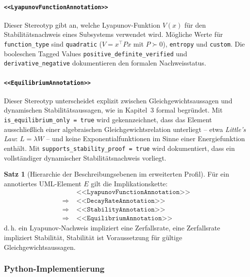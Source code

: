 ﻿\documentclass[a4paper,12pt]{scrreprt}
\theoremstyle{definition}
\newtheorem{satz}{Satz}[section]
\begin{document}
\paragraph{\texttt{<<LyapunovFunctionAnnotation>>}}

Dieser Stereotyp gibt an, welche Lyapunov-Funk\-tion $V(x)$ für den
Stabilitätsnachweis eines Subsystems verwendet wird. Mögliche Werte für
\texttt{function\_type} sind \texttt{quadratic} ($V = x^\top P x$ mit
$P \succ 0$), \texttt{entropy} und \texttt{custom}. Die booleschen Tagged
Values \texttt{positive\_definite\_verified} und
\texttt{derivative\_nega\newline tive} dokumentieren den formalen Nachweisstatus.

\paragraph{\texttt{<<EquilibriumAnnotation>>}}

Dieser Stereotyp unterscheidet explizit zwischen Gleichgewichtsaussagen und
dynamischen Stabilitätsaussagen, wie in Kapitel~3 formal begründet. Mit
\texttt{is\_equilibrium\_only = true} wird gekennzeichnet, dass das Element
ausschließlich einer algebraischen Gleichgewichtsrelation unterliegt -- etwa
\textit{Little's Law}: $L = \lambda W$ -- und keine Exponentialfunktionen
im Sinne einer Energiefunktion enthält. Mit
\texttt{supports\_stability\_proof = true} wird dokumentiert, dass ein
vollständiger dynamischer Stabilitätsnachweis vorliegt.

\begin{satz}[Hierarchie der Beschreibungsebenen im erweiterten Profil]
	Für ein annotiertes UML-Element $E$ gilt die Implikationskette:
	\[
	\begin{aligned}
		& \texttt{<<LyapunovFunctionAnnotation>>} \\
		\Rightarrow\; & \texttt{<<DecayRateAnnotation>>} \\
		\Rightarrow\; & \texttt{<<StabilityAnnotation>>} \\
		\Rightarrow\; & \texttt{<<EquilibriumAnnotation>>}
	\end{aligned}
	\]
	d.\,h. ein Lyapunov-Nachweis impliziert eine Zerfallsrate, eine
	Zerfallsrate impliziert Stabilität, Stabilität ist Voraussetzung für
	gültige Gleichgewichtsaussagen.
\end{satz}

\subsubsection{Python-Implementierung}
\end{document}
